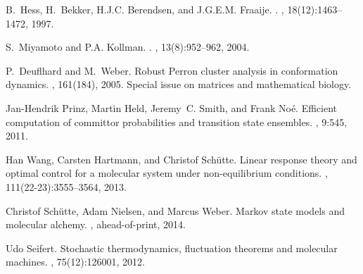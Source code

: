 \documentclass[journal=jctcce,manuscript=article]{achemso}
\begin{document}
\begin{thebibliography}{10}
B.~Hess, H.~Bekker, H.J.C. Berendsen, and J.G.E.M. Fraaije.
.
, 18(12):1463--1472, 1997.

S.~Miyamoto and P.A. Kollman.
.
, 13(8):952--962, 2004.

P.~Deuflhard and M.~Weber.
\newblock Robust {P}erron cluster analysis in conformation dynamics.
, 161(184), 2005.
 Special issue on matrices and mathematical biology.

Jan-Hendrik Prinz, Martin Held, Jeremy~C. Smith, and Frank No{\'e}.
\newblock Efficient computation of committor probabilities and transition state
  ensembles.
, 9:545, 2011.

Han Wang, Carsten Hartmann, and Christof Sch{\"u}tte.
\newblock Linear response theory and optimal control for a molecular system
  under non-equilibrium conditions.
, 111(22-23):3555--3564, 2013.

Christof Sch{\"u}tte, Adam Nielsen, and Marcus Weber.
\newblock Markov state models and molecular alchemy.
, ahead-of-print, 2014.

Udo Seifert.
\newblock Stochastic thermodynamics, fluctuation theorems and molecular
  machines.
, 75(12):126001, 2012.

\end{thebibliography}
\end{document}
